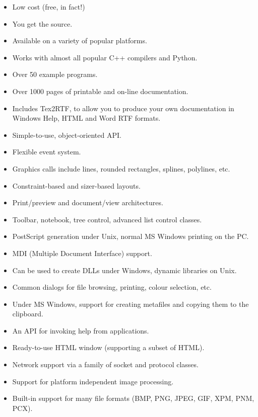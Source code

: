 \begin{itemize}\itemsep=0pt
\item Low cost (free, in fact!)
\item You get the source.
\item Available on a variety of popular platforms.
\item Works with almost all popular C++ compilers and Python.
\item Over 50 example programs.
\item Over 1000 pages of printable and on-line documentation.
\item Includes Tex2RTF, to allow you to produce your own documentation
in Windows Help, HTML and Word RTF formats.
\item Simple-to-use, object-oriented API.
\item Flexible event system.
\item Graphics calls include lines, rounded rectangles, splines, polylines, etc.
\item Constraint-based and sizer-based layouts.
\item Print/preview and document/view architectures.
\item Toolbar, notebook, tree control, advanced list control classes.
\item PostScript generation under Unix, normal MS Windows printing on the PC.
\item MDI (Multiple Document Interface) support.
\item Can be used to create DLLs under Windows, dynamic libraries on Unix.
\item Common dialogs for file browsing, printing, colour selection, etc.
\item Under MS Windows, support for creating metafiles and copying
them to the clipboard.
\item An API for invoking help from applications.
\item Ready-to-use HTML window (supporting a subset of HTML).
\item Network support via a family of socket and protocol classes.
\item Support for platform independent image processing.
\item Built-in support for many file formats (BMP, PNG, JPEG, GIF, XPM, PNM, PCX).
\end{itemize}

